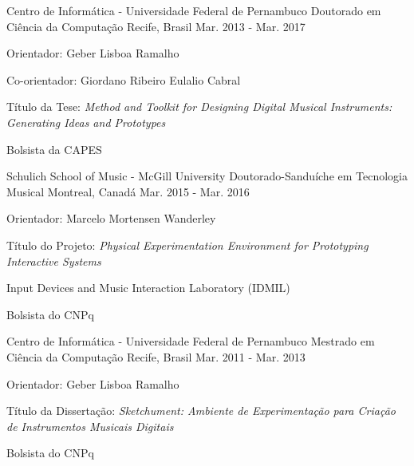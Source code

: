 
\begin{cventries}
  \cventry
    {Centro de Informática - Universidade Federal de Pernambuco} %
    {Doutorado em Ciência da Computação} %
    {Recife, Brasil} %
    {Mar. 2013 - Mar. 2017} %
    {
      \begin{cvitems} %
        \item {Orientador: Geber Lisboa Ramalho}
        \item {Co-orientador: Giordano Ribeiro Eulalio Cabral}
        \item {Título da Tese: \textit{Method and Toolkit for Designing Digital Musical Instruments: Generating Ideas and Prototypes}}
        \item {Bolsista da CAPES}
      \end{cvitems}
    }

  \cventry
    {Schulich School of Music - McGill University} %
    {Doutorado-Sanduíche em Tecnologia Musical} %
    {Montreal, Canadá} %
    {Mar. 2015 - Mar. 2016} %
    {
      \begin{cvitems} %
        \item {Orientador: Marcelo Mortensen Wanderley}
        \item {Título do Projeto: \textit{Physical Experimentation Environment for Prototyping Interactive Systems} }
        \item {Input Devices and Music Interaction Laboratory (IDMIL)}
        \item {Bolsista do CNPq}
      \end{cvitems}
    }

  \cventry
    {Centro de Informática - Universidade Federal de Pernambuco} %
    {Mestrado em Ciência da Computação} %
    {Recife, Brasil} %
    {Mar. 2011 - Mar. 2013} %
    {
      \begin{cvitems} %
        \item {Orientador: Geber Lisboa Ramalho}
        \item {Título da Dissertação: \textit{Sketchument: Ambiente de Experimentação para Criação de Instrumentos Musicais Digitais}}
        \item {Bolsista do CNPq}
      \end{cvitems}
    }


\end{cventries}
